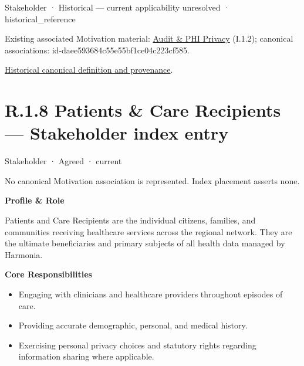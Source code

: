 \label{element:5f6d333e94634420b8a8bbf8b9cb6e2a}
{\small Stakeholder · Historical — current applicability unresolved · historical\_reference}\par
{\small Existing associated Motivation material: \hyperref[element:499313a0a5d84520a3061120ae9b6dac]{Audit \& PHI Privacy} (I.1.2); canonical associations: id-daee593684c55e55bf1ce04c223cf585.}\par
\href{../../../../continuum/motivation/stakeholder/5f6d333e94634420b8a8bbf8b9cb6e2a.md}{Historical canonical definition and provenance}.\par
\section*{R.1.8 Patients \& Care Recipients — Stakeholder index entry}
\label{navigation:R.1.8}

\label{element:ea5a315450ce4cfb87417263560c2b6d}
{\small Stakeholder · Agreed · current}\par
No canonical Motivation association is represented. Index placement asserts none.\par

\par\medskip\textbf{Profile \& Role}\par


Patients and Care Recipients are the individual citizens, families, and communities receiving healthcare services across the regional network. They are the ultimate beneficiaries and primary subjects of all health data managed by Harmonia.



\par\medskip\textbf{Core Responsibilities}\par


\begin{itemize}


\item Engaging with clinicians and healthcare providers throughout episodes of care.

\item Providing accurate demographic, personal, and medical history.

\item Exercising personal privacy choices and statutory rights regarding information sharing where applicable.

\end{itemize}


